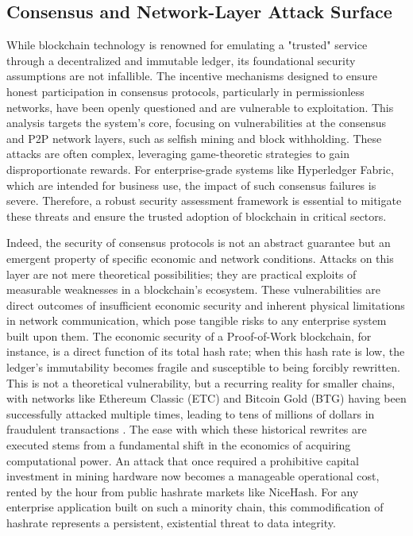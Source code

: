\subsection{Consensus and Network-Layer Attack Surface}
While blockchain technology is renowned for emulating a "trusted" service through a decentralized and immutable ledger, its foundational security assumptions are not infallible. The incentive mechanisms designed to ensure honest participation in consensus protocols, particularly in permissionless networks, have been openly questioned and are vulnerable to exploitation. This analysis targets the system's core, focusing on vulnerabilities at the consensus and P2P network layers, such as selfish mining and block withholding. These attacks are often complex, leveraging game-theoretic strategies to gain disproportionate rewards. For enterprise-grade systems like Hyperledger Fabric, which are intended for business use, the impact of such consensus failures is severe. Therefore, a robust security assessment framework is essential to mitigate these threats and ensure the trusted adoption of blockchain in critical sectors.

Indeed, the security of consensus protocols is not an abstract guarantee but an emergent property of specific economic and network conditions. Attacks on this layer are not mere theoretical possibilities; they are practical exploits of measurable weaknesses in a blockchain's ecosystem. These vulnerabilities are direct outcomes of insufficient economic security and inherent physical limitations in network communication, which pose tangible risks to any enterprise system built upon them. The economic security of a Proof-of-Work blockchain, for instance, is a direct function of its total hash rate; when this hash rate is low, the ledger's immutability becomes fragile and susceptible to being forcibly rewritten. This is not a theoretical vulnerability, but a recurring reality for smaller chains, with networks like Ethereum Classic (ETC) and Bitcoin Gold (BTG) having been successfully attacked multiple times, leading to tens of millions of dollars in fraudulent transactions \cite{Casino2019}. The ease with which these historical rewrites are executed stems from a fundamental shift in the economics of acquiring computational power. An attack that once required a prohibitive capital investment in mining hardware now becomes a manageable operational cost, rented by the hour from public hashrate markets like NiceHash. For any enterprise application built on such a minority chain, this commodification of hashrate represents a persistent, existential threat to data integrity.

